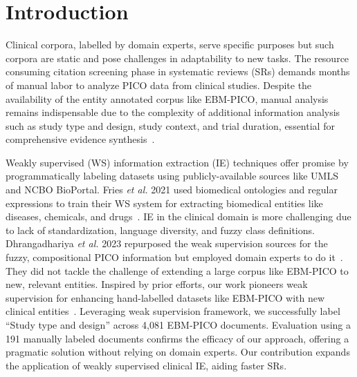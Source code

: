 \documentclass{IOS-Book-Article}
\begin{document}
\section{Introduction}
\label{sec:intro}
%
Clinical corpora, labelled by domain experts, serve specific purposes but such corpora are static and pose challenges in adaptability to new tasks. 
The resource consuming citation screening phase in systematic reviews (SRs) demands months of manual labor to analyze PICO data from clinical studies.
Despite the availability of the entity annotated corpus like EBM-PICO, manual analysis remains indispensable due to the complexity of additional information analysis such as study type and design, study context, and trial duration, essential for comprehensive evidence synthesis~\cite{methley2014pico}.



Weakly supervised (WS) information extraction (IE) techniques offer promise by programmatically labeling datasets using publicly-available sources like UMLS and NCBO BioPortal.
Fries \textit{et al.} 2021 used biomedical ontologies and regular expressions to train their WS system for extracting biomedical entities like diseases, chemicals, and drugs~\cite{fries2021ontology}. 
IE in the clinical domain is more challenging due to lack of standardization, language diversity, and fuzzy class definitions. 
Dhrangadhariya \textit{et al.} 2023 repurposed the weak supervision sources for the fuzzy, compositional PICO information but employed domain experts to do it~\cite{dhrangadhariya2023not}.
They did not tackle the challenge of extending a large corpus like EBM-PICO to new, relevant entities.
Inspired by prior efforts, our work pioneers weak supervision for enhancing hand-labelled datasets like EBM-PICO with new clinical entities~\cite{nye2018corpus}.
Leveraging weak supervision framework, we successfully label ``Study type and design'' across 4,081 EBM-PICO documents.
Evaluation using a 191 manually labeled documents confirms the efficacy of our approach, offering a pragmatic solution without relying on domain experts.
Our contribution expands the application of weakly supervised clinical IE, aiding faster SRs.
%
%
%
\end{document}

